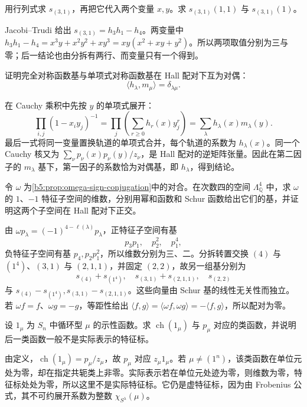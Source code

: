 \begin{exercise}\label{b5:ex:07-schur-two-variables}
	用行列式求 \(s_{(3,1)}\)，再把它代入两个变量 \(x,y\)。求 \(s_{(3,1)}(1,1)\) 与 \(s_{(3,1)}(1)\)。
\end{exercise}
\begin{solution}
	Jacobi--Trudi 给出 \(s_{(3,1)}=h_3h_1-h_4\)。两变量中 \(h_3h_1-h_4=x^3y+x^2y^2+xy^3=xy(x^2+xy+y^2)\)。所以两项取值分别为三与零；后一结论也由分拆有两行、而变量只有一个得到。
\end{solution}

\begin{exercise}\label{b5:ex:07-h-m-duality}
	证明完全对称函数基与单项式对称函数基在 Hall 配对下互为对偶：
	\[
		\langle h_\lambda,m_\mu\rangle=\delta_{\lambda\mu}.
	\]
\end{exercise}
\begin{solution}
	在 Cauchy 乘积中先按 \(y\) 的单项式展开：
	\[
		\prod_{i,j}(1-x_iy_j)^{-1} =\prod_j\left(\sum_{r\ge0}h_r(x)y_j^r\right) =\sum_\lambda h_\lambda(x)m_\lambda(y).
	\]
	最后一式将同一变量置换轨道的单项式合并，每个轨道的系数为 \(h_\lambda(x)\)。同一个 Cauchy 核又为 \(\sum_\nu p_\nu(x)p_\nu(y)/z_\nu\)，是 Hall 配对的逆矩阵张量。因此在第二因子的 \(m_\lambda\) 基下，第一因子的系数恰为对偶基，即 \(h_\lambda\)，得到结论。
\end{solution}

\begin{exercise}\label{b5:ex:07-omega}
	令 \(\omega\) 为\cref{b5:prop:omega-sign-conjugation}中的对合。在次数四的空间 \(\Lambda_{\mathbb Q}^4\) 中，求 \(\omega\) 的 \(1\)、\(-1\) 特征子空间的维数，分别用幂和函数和 Schur 函数给出它们的基，并证明这两个子空间在 Hall 配对下正交。
\end{exercise}
\begin{solution}
	由 \(\omega p_\lambda=(-1)^{4-\ell(\lambda)}p_\lambda\)，正特征子空间有基
	\[
		p_3p_1,\quad p_2^2,\quad p_1^4,
	\]
	负特征子空间有基 \(p_4,p_2p_1^2\)，所以维数分别为三、二。分拆转置交换 \((4)\) 与 \((1^4)\)、\((3,1)\) 与 \((2,1,1)\)，并固定 \((2,2)\)，故另一组基分别为
	\[
		s_{(4)}+s_{(1^4)},\quad s_{(3,1)}+s_{(2,1,1)},\quad s_{(2,2)}
	\]
	与 \(s_{(4)}-s_{(1^4)},s_{(3,1)}-s_{(2,1,1)}\)。这些向量由 Schur 基的线性无关性而独立。若 \(\omega f=f\)、\(\omega g=-g\)，等距性给出 \(\langle f,g\rangle=\langle\omega f,\omega g\rangle=-\langle f,g\rangle\)，所以配对为零。
\end{solution}

\begin{exercise}\label{b5:ex:07-class-indicator}
	设 \(1_\mu\) 为 \(S_n\) 中循环型 \(\mu\) 的示性函数。求 \(\operatorname{ch}(1_\mu)\) 与 \(p_\mu\) 对应的类函数，并说明后一类函数一般不是实际表示的特征标。
\end{exercise}
\begin{solution}
	由定义，\(\operatorname{ch}(1_\mu)=p_\mu/z_\mu\)，故 \(p_\mu\) 对应 \(z_\mu1_\mu\)。若 \(\mu\ne(1^n)\)，该类函数在单位元处为零，却在指定共轭类上非零。实际表示若在单位元处迹为零，则维数为零，特征标处处为零，所以这里不是实际特征标。它仍是虚特征标，因为由 Frobenius 公式，其不可约展开系数为整数 \(\chi_{S^\lambda}(\mu)\)。
\end{solution}

